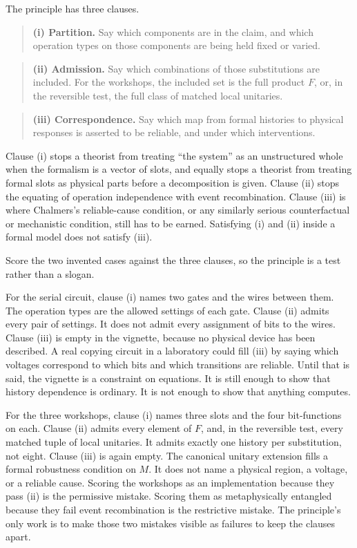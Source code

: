 \documentclass[12pt]{article}
\begin{document}
The principle has three clauses.

\begin{quote}
\textbf{(i) Partition.} Say which components are in the claim, and which operation types on those components are being held fixed or varied.
\end{quote}

\begin{quote}
\textbf{(ii) Admission.} Say which combinations of those substitutions are included. For the workshops, the included set is the full product \(F\), or, in the reversible test, the full class of matched local unitaries.
\end{quote}

\begin{quote}
\textbf{(iii) Correspondence.} Say which map from formal histories to physical responses is asserted to be reliable, and under which interventions.
\end{quote}

Clause (i) stops a theorist from treating ``the system'' as an unstructured whole when the formalism is a vector of slots, and equally stops a theorist from treating formal slots as physical parts before a decomposition is given. Clause (ii) stops the equating of operation independence with event recombination. Clause (iii) is where Chalmers's reliable-cause condition, or any similarly serious counterfactual or mechanistic condition, still has to be earned. Satisfying (i) and (ii) inside a formal model does not satisfy (iii).

Score the two invented cases against the three clauses, so the principle is a test rather than a slogan.

For the serial circuit, clause (i) names two gates and the wires between them. The operation types are the allowed settings of each gate. Clause (ii) admits every pair of settings. It does not admit every assignment of bits to the wires. Clause (iii) is empty in the vignette, because no physical device has been described. A real copying circuit in a laboratory could fill (iii) by saying which voltages correspond to which bits and which transitions are reliable. Until that is said, the vignette is a constraint on equations. It is still enough to show that history dependence is ordinary. It is not enough to show that anything computes.

For the three workshops, clause (i) names three slots and the four bit-functions on each. Clause (ii) admits every element of \(F\), and, in the reversible test, every matched tuple of local unitaries. It admits exactly one history per substitution, not eight. Clause (iii) is again empty. The canonical unitary extension fills a formal robustness condition on \(M\). It does not name a physical region, a voltage, or a reliable cause. Scoring the workshops as an implementation because they pass (ii) is the permissive mistake. Scoring them as metaphysically entangled because they fail event recombination is the restrictive mistake. The principle's only work is to make those two mistakes visible as failures to keep the clauses apart.
\end{document}
